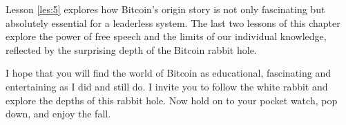 Lesson \ref{les:5} explores how Bitcoin's origin story is not only fascinating but
absolutely essential for a leaderless system. The last two lessons of this
chapter explore the power of free speech and the limits of our individual
knowledge, reflected by the surprising depth of the Bitcoin rabbit hole.

I hope that you will find the world of Bitcoin as educational, fascinating and
entertaining as I did and still do. I invite you to follow the white rabbit and
explore the depths of this rabbit hole. Now hold on to your pocket watch, pop
down, and enjoy the fall.
